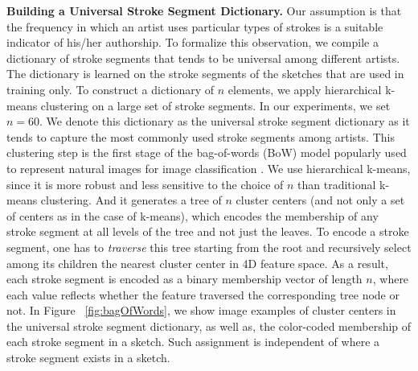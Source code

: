 \noindent\textbf{Building a Universal Stroke Segment Dictionary.} Our assumption is that the frequency in which an artist uses particular types of strokes is a suitable indicator of his/her authorship. To formalize this observation, we compile a dictionary of stroke segments that tends to be universal among different artists. The dictionary is learned on the stroke segments of the sketches that are used in training only. To construct a dictionary of $n$ elements, we apply hierarchical k-means clustering on a large set of stroke segments. In our experiments, we set $n=60$. We denote this dictionary as the universal stroke segment dictionary as it tends to capture the most commonly used stroke segments among artists. This clustering step is the first stage of the bag-of-words (BoW) model popularly used to represent natural images for image classification \cite{Sivic03}. We use hierarchical k-means, since it is more robust and less sensitive to the choice of $n$ than traditional k-means clustering. And it generates a tree of $n$ cluster centers (and not only a set of centers as in the case of k-means), which encodes the membership of any stroke segment at all levels of the tree and not just the leaves. To encode a stroke segment, one has to \emph{traverse} this tree starting from the root and recursively select among its children the nearest cluster center in 4D feature space. As a result, each stroke segment is encoded as a binary membership vector of length $n$, where each value reflects whether the feature traversed the corresponding tree node or not. In Figure ~\ref{fig:bagOfWords}, we show image examples of cluster centers in the universal stroke segment dictionary, as well as, the color-coded membership of each stroke segment in a sketch. Such assignment is independent of where a stroke segment exists in a sketch.


